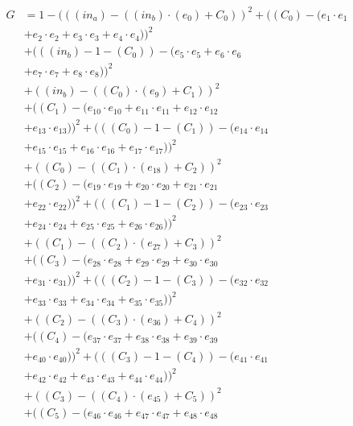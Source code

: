 \documentclass[10pt, a4paper]{article}
\begin{document}
\begin{small}
\begin{align*}
G &= 1 - (((in_a) - ((in_b)  \cdot  (e_{0}) + C_{0}))^{2} + ((C_{0}) - (e_{1} \cdot e_{1} \\
& + e_{2} \cdot e_{2} + e_{3} \cdot e_{3} + e_{4} \cdot e_{4}))^{2} \\
& + (((in_b) - 1 - (C_{0})) - (e_{5} \cdot e_{5} + e_{6} \cdot e_{6} \\
& + e_{7} \cdot e_{7} + e_{8} \cdot e_{8}))^{2} \\
& + ((in_b) - ((C_{0})  \cdot  (e_{9}) + C_{1}))^{2} \\
& + ((C_{1}) - (e_{10} \cdot e_{10} + e_{11} \cdot e_{11} + e_{12} \cdot e_{12} \\
& + e_{13} \cdot e_{13}))^{2} + (((C_{0}) - 1 - (C_{1})) - (e_{14} \cdot e_{14} \\
& + e_{15} \cdot e_{15} + e_{16} \cdot e_{16} + e_{17} \cdot e_{17}))^{2} \\
& + ((C_{0}) - ((C_{1})  \cdot  (e_{18}) + C_{2}))^{2} \\
& + ((C_{2}) - (e_{19} \cdot e_{19} + e_{20} \cdot e_{20} + e_{21} \cdot e_{21} \\
& + e_{22} \cdot e_{22}))^{2} + (((C_{1}) - 1 - (C_{2})) - (e_{23} \cdot e_{23} \\
& + e_{24} \cdot e_{24} + e_{25} \cdot e_{25} + e_{26} \cdot e_{26}))^{2} \\
& + ((C_{1}) - ((C_{2})  \cdot  (e_{27}) + C_{3}))^{2} \\
& + ((C_{3}) - (e_{28} \cdot e_{28} + e_{29} \cdot e_{29} + e_{30} \cdot e_{30} \\
& + e_{31} \cdot e_{31}))^{2} + (((C_{2}) - 1 - (C_{3})) - (e_{32} \cdot e_{32} \\
& + e_{33} \cdot e_{33} + e_{34} \cdot e_{34} + e_{35} \cdot e_{35}))^{2} \\
& + ((C_{2}) - ((C_{3})  \cdot  (e_{36}) + C_{4}))^{2} \\
& + ((C_{4}) - (e_{37} \cdot e_{37} + e_{38} \cdot e_{38} + e_{39} \cdot e_{39} \\
& + e_{40} \cdot e_{40}))^{2} + (((C_{3}) - 1 - (C_{4})) - (e_{41} \cdot e_{41} \\
& + e_{42} \cdot e_{42} + e_{43} \cdot e_{43} + e_{44} \cdot e_{44}))^{2} \\
& + ((C_{3}) - ((C_{4})  \cdot  (e_{45}) + C_{5}))^{2} \\
& + ((C_{5}) - (e_{46} \cdot e_{46} + e_{47} \cdot e_{47} + e_{48} \cdot e_{48} \\

\end{align*}
\end{small}
\end{document}
